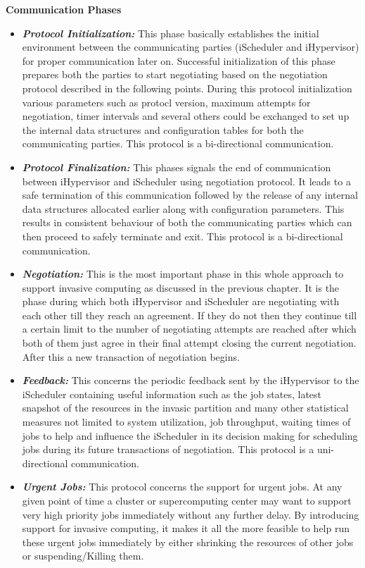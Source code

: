 \textbf{Communication Phases}
\begin{itemize}
\item \textbf{\textit{Protocol Initialization:}} This phase basically establishes the initial environment between the communicating parties (iScheduler and iHypervisor) for proper communication later on. Successful initialization of this phase prepares both the parties to start negotiating based on the negotiation protocol described in the following points. During this protocol initialization various parameters such as protocl version, maximum attempts for negotiation, timer intervals and several others could be exchanged to set up the internal data structures and configuration tables for both the communicating parties. This protocol is a bi-directional communication.
\item \textbf{\textit{Protocol Finalization:}} This phases signals the end of communication between iHypervisor and iScheduler using negotiation protocol. It leads to a safe termination of this communication followed by the release of any internal data structures allocated earlier along with configuration parameters. This results in consistent behaviour of both the communicating parties which can then proceed to safely terminate and exit. This protocol is a bi-directional communication.
\item \textbf{\textit{Negotiation:}} This is the most important phase in this whole approach to support invasive computing as discussed in the previous chapter. It is the phase during which both iHypervisor and iScheduler are negotiating with each other till they reach an agreement. If they do not then they continue till a certain limit to the number of negotiating attempts are reached after which both of them just agree in their final attempt closing the current negotiation. After this a new transaction of negotiation begins.
\item \textbf{\textit{Feedback:}} This concerns the periodic feedback sent by the iHypervisor to the iScheduler containing useful information such as the job states, latest snapshot of the resources in the invasic partition and many other statistical measures not limited to system utilization, job throughput, waiting times of jobs to help and influence the iScheduler in its decision making for scheduling jobs during its future transactions of negotiation. This protocol is a uni-directional communication.
\item \textbf{\textit{Urgent Jobs:}} This protocol concerns the support for urgent jobs. At any given point of time a cluster or supercomputing center may want to support very high priority jobs immediately without any further delay. By introducing support for invasive computing, it makes it all the more feasible to help run these urgent jobs immediately by either shrinking the resources of other jobs or suspending/Killing them.
\end{itemize}


